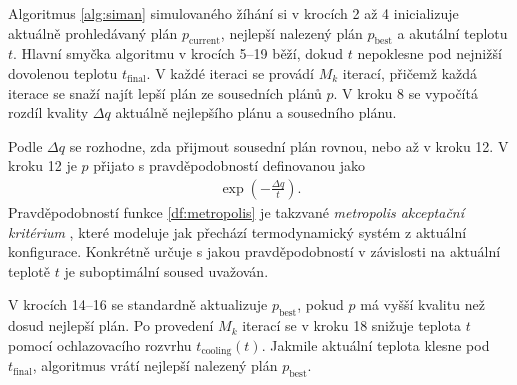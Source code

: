 Algoritmus \ref{alg:siman} simulovaného žíhání si v krocích 2 až 4 inicializuje aktuálně prohledávaný plán $p_{\text{current}}$, nejlepší nalezený plán $p_{\text{best}}$ a akutální teplotu $t$.
Hlavní smyčka algoritmu v krocích 5--19 běží, dokud $t$ nepoklesne pod nejnižší dovolenou teplotu $t_{\text{final}}$.
V každé iteraci se provádí $M_k$ iterací, přičemž každá iterace se snaží najít lepší plán ze sousedních plánů $p$.
V kroku 8 se vypočítá rozdíl kvality $\Delta q$ aktuálně nejlepšího plánu a sousedního plánu.

Podle $\Delta q$ se rozhodne, zda přijmout sousední plán rovnou, nebo až v kroku 12.
V kroku 12 je $p$ přijato s pravděpodobností definovanou jako
\begin{align}\label{df:metropolis}
  \exp\left(-\frac{\Delta q}{t}\right).
\end{align}
Pravděpodobností funkce \ref{df:metropolis} je takzvané \textit{metropolis akceptační kritérium} \cite{Metropolis}, které modeluje
jak přechází termodynamický systém z aktuální konfigurace.
Konkrétně určuje s jakou pravděpodobností v závislosti na aktuální teplotě $t$ je suboptimální soused uvažován.

V krocích 14--16 se standardně aktualizuje $p_{\text{best}}$, pokud $p$ má vyšší kvalitu než dosud nejlepší plán.
Po provedení $M_k$ iterací se v kroku 18 snižuje teplota $t$ pomocí ochlazovacího rozvrhu $t_{\text{cooling}}(t)$.
Jakmile aktuální teplota klesne pod $t_{\text{final}}$, algoritmus vrátí nejlepší nalezený plán $p_{\text{best}}$.

